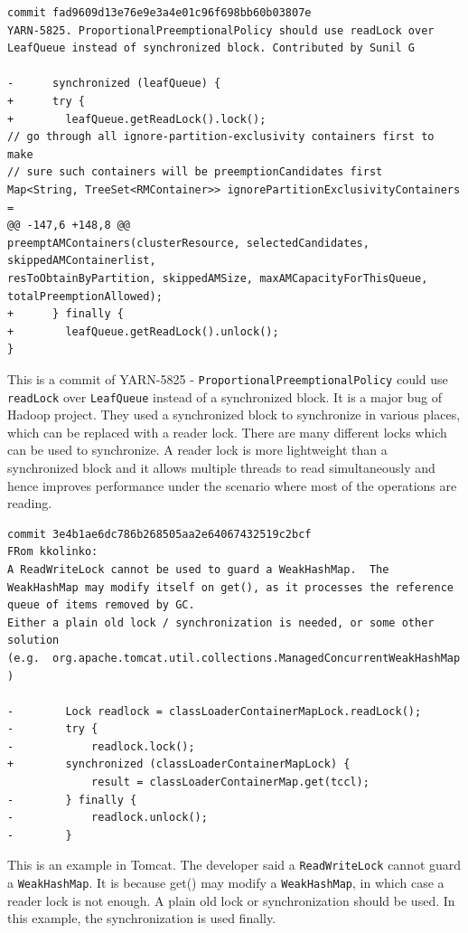 \begin{lstlisting}
commit fad9609d13e76e9e3a4e01c96f698bb60b03807e
YARN-5825. ProportionalPreemptionalPolicy should use readLock over LeafQueue instead of synchronized block. Contributed by Sunil G

-      synchronized (leafQueue) {
+      try {
+        leafQueue.getReadLock().lock();
// go through all ignore-partition-exclusivity containers first to make
// sure such containers will be preemptionCandidates first
Map<String, TreeSet<RMContainer>> ignorePartitionExclusivityContainers =
@@ -147,6 +148,8 @@
preemptAMContainers(clusterResource, selectedCandidates, skippedAMContainerlist,
resToObtainByPartition, skippedAMSize, maxAMCapacityForThisQueue,
totalPreemptionAllowed);
+      } finally {
+        leafQueue.getReadLock().unlock();
}
\end{lstlisting}

This is a commit of YARN-5825 - \texttt{ProportionalPreemptionalPolicy} could use \texttt{readLock} over \texttt{LeafQueue} instead of a synchronized block. It is a major bug of Hadoop project. They used a synchronized block to synchronize in various places, which can be replaced with a reader lock. There are many different locks which can be used to synchronize. A reader lock is more lightweight than a synchronized block and it allows multiple threads to read simultaneously and hence improves performance under the scenario where most of the operations are reading.

\begin{lstlisting}
commit 3e4b1ae6dc786b268505aa2e64067432519c2bcf
FRom kkolinko:
A ReadWriteLock cannot be used to guard a WeakHashMap.  The
WeakHashMap may modify itself on get(), as it processes the reference
queue of items removed by GC.
Either a plain old lock / synchronization is needed, or some other solution
(e.g.  org.apache.tomcat.util.collections.ManagedConcurrentWeakHashMap )

-        Lock readlock = classLoaderContainerMapLock.readLock();
-        try {
-            readlock.lock();
+        synchronized (classLoaderContainerMapLock) {
             result = classLoaderContainerMap.get(tccl);
-        } finally {
-            readlock.unlock();
-        }
\end{lstlisting}

This is an example in Tomcat. The developer said a \texttt{ReadWriteLock} cannot guard a \texttt{WeakHashMap}. It is because get() may modify a \texttt{WeakHashMap}, in which case a reader lock is not enough. A plain old lock or synchronization should be used. In this example, the synchronization is used finally.

